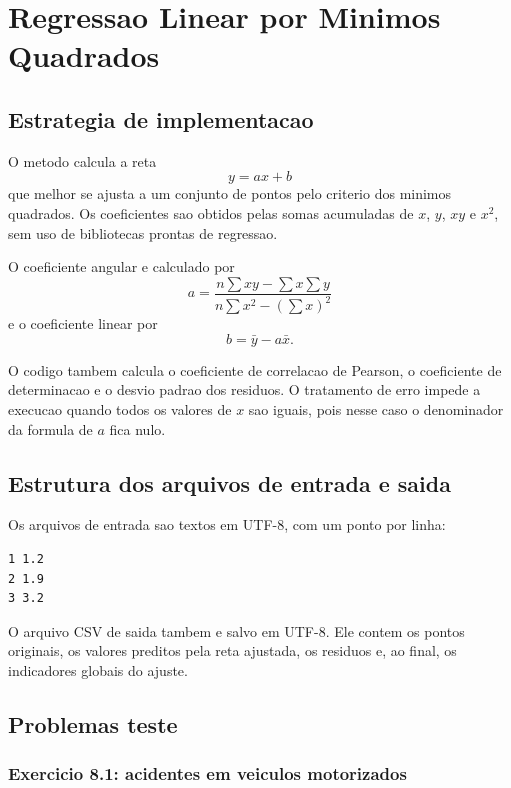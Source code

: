 \documentclass[../main.tex]{subfiles}
\begin{document}
\section{Regressao Linear por Minimos Quadrados}

\subsection{Estrategia de implementacao}

O metodo calcula a reta
\[
    y = ax + b
\]
que melhor se ajusta a um conjunto de pontos pelo criterio dos minimos
quadrados. Os coeficientes sao obtidos pelas somas acumuladas de \(x\), \(y\),
\(xy\) e \(x^2\), sem uso de bibliotecas prontas de regressao.

O coeficiente angular e calculado por
\[
    a = \frac{n\sum xy - \sum x \sum y}{n\sum x^2 - (\sum x)^2}
\]
e o coeficiente linear por
\[
    b = \bar{y} - a\bar{x}.
\]

O codigo tambem calcula o coeficiente de correlacao de Pearson, o coeficiente
de determinacao e o desvio padrao dos residuos. O tratamento de erro impede a
execucao quando todos os valores de \(x\) sao iguais, pois nesse caso o
denominador da formula de \(a\) fica nulo.

\subsection{Estrutura dos arquivos de entrada e saida}

Os arquivos de entrada sao textos em UTF-8, com um ponto por linha:

\begin{lstlisting}[language={},caption={Formato de entrada em TXT}]
1 1.2
2 1.9
3 3.2
\end{lstlisting}

O arquivo CSV de saida tambem e salvo em UTF-8. Ele contem os pontos originais,
os valores preditos pela reta ajustada, os residuos e, ao final, os indicadores
globais do ajuste.

\subsection{Problemas teste}

\subsubsection{Exercicio 8.1: acidentes em veiculos motorizados}
\end{document}
